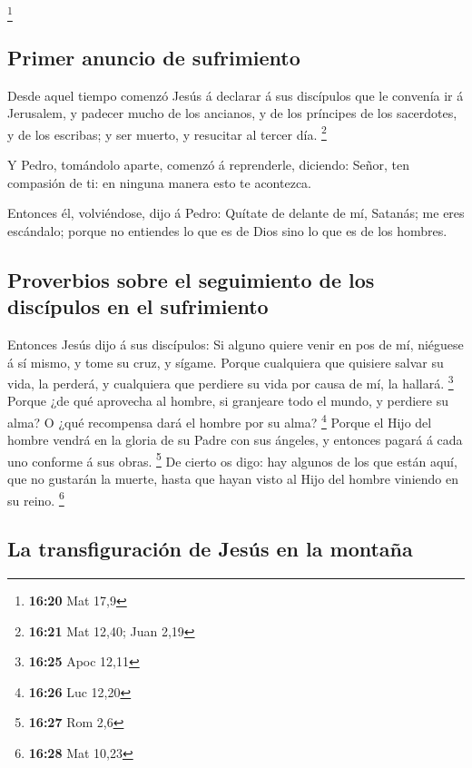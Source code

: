 \footnote{\textbf{16:20} Mat 17,9}

\hypertarget{primer-anuncio-de-sufrimiento}{%
\subsection{Primer anuncio de
sufrimiento}\label{primer-anuncio-de-sufrimiento}}

 Desde aquel tiempo comenzó Jesús á declarar á sus
discípulos que le convenía ir á Jerusalem, y padecer mucho de los
ancianos, y de los príncipes de los sacerdotes, y de los escribas; y ser
muerto, y resucitar al tercer día. \footnote{\textbf{16:21} Mat 12,40;
  Juan 2,19}

 Y Pedro, tomándolo aparte, comenzó á reprenderle,
diciendo: Señor, ten compasión de ti: en ninguna manera esto te
acontezca.

 Entonces él, volviéndose, dijo á Pedro: Quítate de
delante de mí, Satanás; me eres escándalo; porque no entiendes lo que es
de Dios sino lo que es de los hombres.

\hypertarget{proverbios-sobre-el-seguimiento-de-los-discuxedpulos-en-el-sufrimiento}{%
\subsection{Proverbios sobre el seguimiento de los discípulos en el
sufrimiento}\label{proverbios-sobre-el-seguimiento-de-los-discuxedpulos-en-el-sufrimiento}}

 Entonces Jesús dijo á sus discípulos: Si alguno quiere
venir en pos de mí, niéguese á sí mismo, y tome su cruz, y sígame.
 Porque cualquiera que quisiere salvar su vida, la
perderá, y cualquiera que perdiere su vida por causa de mí, la hallará.
\footnote{\textbf{16:25} Apoc 12,11}  Porque ¿de qué
aprovecha al hombre, si granjeare todo el mundo, y perdiere su alma? O
¿qué recompensa dará el hombre por su alma? \footnote{\textbf{16:26} Luc
  12,20}  Porque el Hijo del hombre vendrá en la gloria
de su Padre con sus ángeles, y entonces pagará á cada uno conforme á sus
obras. \footnote{\textbf{16:27} Rom 2,6}  De cierto os
digo: hay algunos de los que están aquí, que no gustarán la muerte,
hasta que hayan visto al Hijo del hombre viniendo en su reino.
\footnote{\textbf{16:28} Mat 10,23}

\hypertarget{la-transfiguraciuxf3n-de-jesuxfas-en-la-montauxf1a}{%
\subsection{La transfiguración de Jesús en la
montaña}\label{la-transfiguraciuxf3n-de-jesuxfas-en-la-montauxf1a}}

